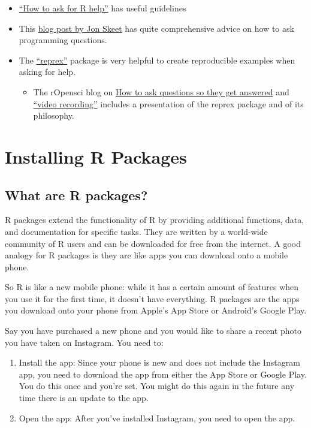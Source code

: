\documentclass[
]{book}
\providecommand{\tightlist}{%
  \setlength{\itemsep}{0pt}\setlength{\parskip}{0pt}}
\begin{document}
\begin{itemize}
\tightlist
\item
  \href{https://blog.revolutionanalytics.com/2014/01/how-to-ask-for-r-help.html}{``How to ask for R help''} has useful guidelines
\item
  This \href{https://codeblog.jonskeet.uk/2010/08/29/writing-the-perfect-question/}{blog post by Jon Skeet} has quite comprehensive advice on how to ask programming questions.
\item
  The \href{https://cran.rstudio.com/web/packages/reprex/}{``reprex''} package is very helpful to create reproducible examples when asking for help.

  \begin{itemize}
  \tightlist
  \item
    The rOpensci blog on \href{https://ropensci.org/commcalls/2017-03-07/}{How to ask questions so they get answered} and \href{https://vimeo.com/208749032}{``video recording''} includes a presentation of the reprex package and of its philosophy.
  \end{itemize}
\end{itemize}

\chapter{Installing R Packages}\label{installing-r-packages}

\section{What are R packages?}\label{what-are-r-packages}

R packages extend the functionality of R by providing additional functions, data, and documentation for specific tasks. They are written by a world-wide community of R users and can be downloaded for free from the internet. A good analogy for R packages is they are like apps you can download onto a mobile phone.

So R is like a new mobile phone: while it has a certain amount of features when you use it for the first time, it doesn't have everything. R packages are the apps you download onto your phone from Apple's App Store or Android's Google Play.

Say you have purchased a new phone and you would like to share a recent photo you have taken on Instagram. You need to:

\begin{enumerate}
\def\labelenumi{\arabic{enumi}.}
\item
  Install the app: Since your phone is new and does not include the Instagram app, you need to download the app from either the App Store or Google Play. You do this once and you're set. You might do this again in the future any time there is an update to the app.
\item
  Open the app: After you've installed Instagram, you need to open the app.
\end{enumerate}
\end{document}
